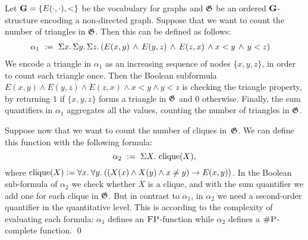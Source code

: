 \begin{exa}\label{ex:cliques}
Let $\mathbf{G} = \{E(\cdot,\cdot),<\}$ be the vocabulary for graphs and $\mathfrak{G}$ be an ordered $\mathbf{G}$-structure encoding a non-directed graph. 
Suppose that we want to count the number of triangles in $\mathfrak{G}$. Then this can be defined as follows:
\begin{align*}
\alpha_1 \ &:= \ \Sigma{x}.\, \Sigma{y}.\, \Sigma{z}.\, ( E(x,y) \, \wedge \, E(y,z) \, \wedge \, E(z,x) \, \wedge x < y \, \wedge \, y < z )
\end{align*}
We encode a triangle in $\alpha_1$ as an increasing sequence of nodes $\{x, y, z\}$, in order to count each triangle once. Then the Boolean subformula  $E(x,y) \wedge E(y,z) \wedge E(z,x) \wedge
x < y \wedge y < z$ is checking the triangle property, by returning $1$ if $\{x, y, z\}$ forms a triangle in $\mathfrak{G}$ and $0$ otherwise.
Finally, the sum quantifiers in $\alpha_1$ aggregates all the values, counting the number of triangles in $\mathfrak{G}$.

Suppose now that we want to count the number of cliques in~$\mathfrak{G}$. We can define this function with the following formula:
\[
\alpha_2 \ := \ \Sigma{X}.\, \operatorname{clique}(X),
\] 
where $\operatorname{clique}(X) := \forall{x}.\: \forall{y}.\: ((X(x) \wedge X(y) \wedge x \neq y)  \rightarrow E(x,y))$.
In the Boolean sub-formula of $\alpha_2$ we check whether $X$ is a clique, and with the sum quantifier we add one for each clique in $\mathfrak{G}$. 
But in contrast to $\alpha_1$, 
in $\alpha_2$ we need a second-order quantifier in the quantitative level.
This is according to the
complexity of evaluating each formula:
$\alpha_1$ defines an $\text{\sc FP}$-function while $\alpha_2$ defines a $\text{\sc \#P}$-complete function. \qed
\end{exa}
